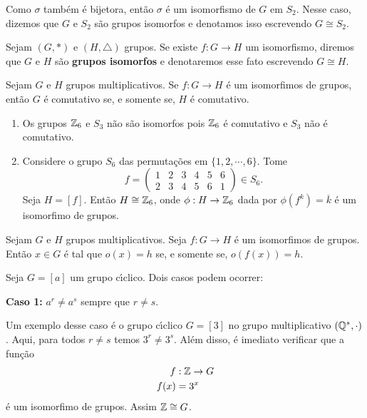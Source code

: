 \vspace{.3cm}

Como $\sigma$ tamb\'em \'e bijetora, ent\~ao $\sigma$ \'e um isomorfismo de $G$ em $S_2$. Nesse caso, dizemos que $G$ e $S_2$ s\~ao grupos isomorfos e denotamos isso escrevendo $G \cong S_2$.

\begin{definicao}
    Sejam $(G, *)$ e $(H, \triangle)$ grupos. Se existe $f : G \to H$ um isomorfismo, diremos que $G$ e $H$ s\~ao \textbf{grupos isomorfos} e denotaremos esse fato escrevendo $G \cong H$.
\end{definicao}

\begin{proposicao}
    Sejam $G$ e $H$ grupos multiplicativos. Se $f : G \to H$ \'e um isomorfimos de grupos, ent\~ao $G$ \'e comutativo se, e somente se, $H$ \'e comutativo.
\end{proposicao}

\begin{exemplos}
    \begin{enumerate}[label={\arabic*})]
        \item Os grupos $\mathbb{Z}_6$ e $S_3$ n\~ao s\~ao isomorfos pois $\mathbb{Z}_6$ \'e comutativo e $S_3$ n\~ao \'e comutativo.

        \item Considere o grupo $S_6$ das permuta\c{c}\~oes em $\{1, 2, \cdots, 6\}$. Tome
        \[
            f = \begin{pmatrix}
                1 & 2 & 3 & 4 & 5 & 6\\
                2 & 3 & 4 & 5 & 6 & 1
            \end{pmatrix} \in S_6.
        \]
        Seja $H = [f]$. Ent\~ao $H \cong \mathbb{Z}_6$, onde $\phi : H \to \mathbb{Z}_6$ dada por $\phi(f^k) = \overline{k}$ \'e um isomorfimo de grupos.
    \end{enumerate}
\end{exemplos}

\begin{proposicao}
    Sejam $G$ e $H$ grupos multiplicativos. Seja $f : G \to H$ \'e um isomorfimos de grupos. Ent\~ao $x \in G$ \'e tal que $o(x) = h$ se, e somente se, $o(f(x)) = h$.
\end{proposicao}

Seja $G = [a]$ um grupo c{\'\i}clico. Dois casos podem ocorrer:

\textbf{Caso 1:} $a^r \ne a^s$ sempre que $r \ne s$.

Um exemplo desse caso \'e o grupo c{\'\i}clico $G = [3]$ no grupo multiplicativo $(\mathbb{Q}^*, \cdot)$. Aqui, para todos $r \ne s$ temos $3^r \ne 3^s$. Al\'em disso, \'e imediato verificar que a fun\c{c}\~ao
\begin{align*}
    f &: \mathbb{Z} \to G\\
    f(x) &= 3^x
\end{align*}
\'e um isomorfimo de grupos. Assim $\mathbb{Z} \cong G$.

